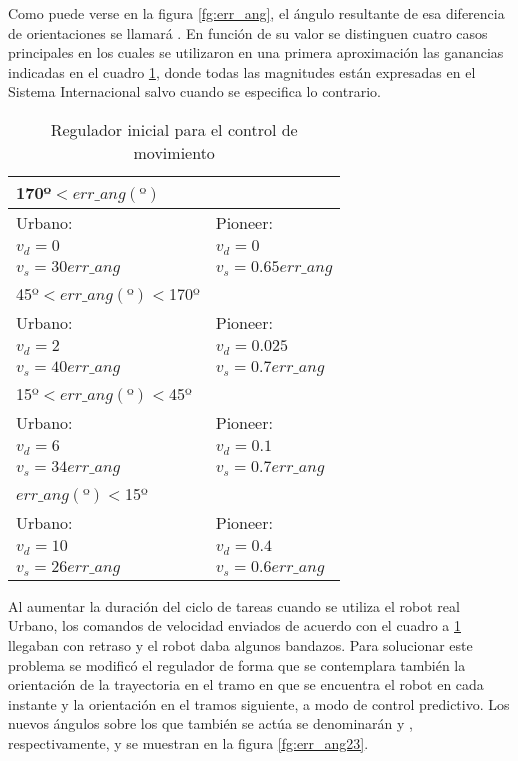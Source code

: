 Como puede verse en la figura \ref{fg:err_ang}, el ángulo resultante de esa diferencia de orientaciones se llamará . En función de su valor se distinguen cuatro casos principales en los cuales se utilizaron en una primera aproximación las ganancias indicadas en el cuadro \ref{vel1}, donde todas las magnitudes están expresadas en el Sistema Internacional salvo cuando se especifica lo contrario.

\begin{table}[hbt]
\begin{center}
\caption{Regulador inicial para el control de movimiento} \label{vel1}

\vspace{5mm}

\begin{tabular}{ll}
\hline\hline
170º$<err\_ang(º)$ \\ \hline
Urbano:      &  Pioneer:   \\
        $v_{d}=0$                   & $v_{d}=0$\\
        $v_{s}=30err\_ang$  & $v_{s}=0.65err\_ang$ \\
\hline
  45º$<err\_ang(º)<$170º \\ \hline
Urbano:  & Pioneer:\\
        $v_{d}=2$                  & $v_{d}=0.025$\\
        $v_{s}=40err\_ang$ & $v_{s}=0.7err\_ang$\\
\hline
15º$<err\_ang(º)<$45º \\ \hline
Urbano:      &  Pioneer:   \\
        $v_{d}=6$                  & $v_{d}=0.1$\\
        $v_{s}=34err\_ang$ & $v_{s}=0.7err\_ang$ \\
\hline
$err\_ang(º)<$15º \\ \hline
Urbano:  & Pioneer: \\
        $v_{d}=10$                & $v_{d}=0.4$\\
        $v_{s}=26err\_ang$ & $v_{s}=0.6err\_ang$\\
\hline\hline
\end{tabular}
\end{center}
\end{table}

Al aumentar la duración del ciclo de tareas cuando se utiliza el robot real Urbano, los comandos de velocidad enviados de acuerdo con el cuadro a \ref{vel1} llegaban con retraso y el robot daba algunos bandazos. Para solucionar este problema se modificó el regulador de forma que se contemplara también la orientación de la trayectoria en el tramo en que se encuentra el robot en cada instante y la orientación en el tramos siguiente, a modo de control predictivo. Los nuevos ángulos sobre los que también se actúa se denominarán  y , respectivamente, y se muestran en la figura \ref{fg:err_ang23}.

